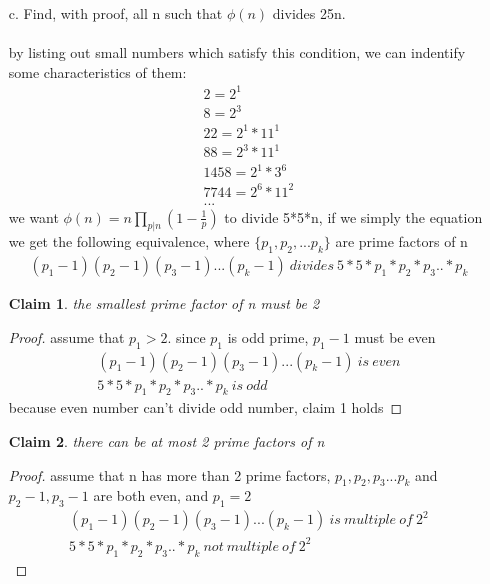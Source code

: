 \documentclass[12pt,letterpaper]{article}
\newtheorem{claim}{Claim}
\begin{document}
\begin{enumerate}
\begin{proof}
    \end{proof}
  \item[c.]
    Find, with proof, all n such that $\phi(n)$ divides 25n. \\ \\ 
    by listing out small numbers which satisfy this condition, we can indentify some characteristics of them: 
    \begin{align*}
      2 = 2^1 \\
      8 = 2^3 \\
      22 = 2^1*11^1 \\
      88 = 2^3*11^1 \\
      1458 = 2^1*3^6 \\
      7744 = 2^6*11^2 \\
      ...
    \end{align*}
    we want $\phi(n) = n\prod_{p | n}(1 - \frac{1}{p})$ to divide 5*5*n, if we simply the equation we get the following equivalence, where $\{p_1, p_2, ... p_k\}$ are prime factors of n
    \setcounter{equation}{0}
    \begin{align}
          (p_1-1)(p_2-1)(p_3-1)...(p_k-1) \ divides \ 5*5*p_1*p_2*p_3..*p_k
    \end{align}
    \begin{claim}
      the smallest prime factor of n must be 2
    \end{claim}
    \begin{proof}
      assume that $p_1 > 2$. since $p_1$ is odd prime, $p_1-1$ must be even
      \begin{align*}
        (p_1-1)(p_2-1)(p_3-1)...(p_k-1) \ is \ even \\
        5*5*p_1*p_2*p_3..*p_k \ is \ odd
      \end{align*}
      because even number can't divide odd number, claim 1 holds
    \end{proof} 
    \vspace{3}
    \begin{claim}
      there can be at most 2 prime factors of n
    \end{claim}
    \begin{proof}
      assume that n has more than 2 prime factors, $p_1, p_2, p_3...p_k$ and $p_2-1, p_3-1$ are both even, and $p_1 = 2$
      \begin{align*}
        (p_1-1)(p_2-1)(p_3-1)...(p_k-1) \ is \ multiple \ of \ 2^2 \\
        5*5*p_1*p_2*p_3..*p_k \ not \ multiple \ of \ 2^2
      \end{align*}

\end{proof}
\end{enumerate}
\end{document}

